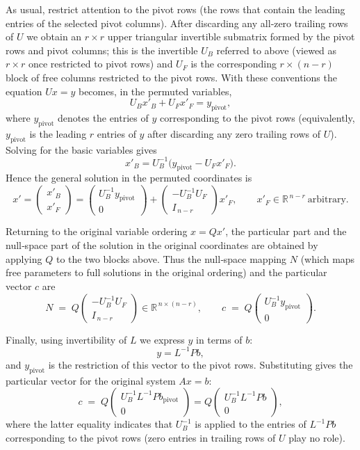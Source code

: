 \documentclass{article}
\begin{document}
As usual, restrict attention to the pivot rows (the rows that contain the leading entries of the selected pivot columns). After discarding any all‑zero trailing rows of \(U\) we obtain an \(r\times r\) upper triangular invertible submatrix formed by the pivot rows and pivot columns; this is the invertible \(U_B\) referred to above (viewed as \(r\times r\) once restricted to pivot rows) and \(U_F\) is the corresponding \(r\times(n-r)\) block of free columns restricted to the pivot rows. With these conventions the equation \(Ux=y\) becomes, in the permuted variables,
\[
U_B x'_B + U_F x'_F = y_{\mathrm{pivot}},
\]
where \(y_{\mathrm{pivot}}\) denotes the entries of \(y\) corresponding to the pivot rows (equivalently, \(y_{\mathrm{pivot}}\) is the leading \(r\) entries of \(y\) after discarding any zero trailing rows of \(U\)). Solving for the basic variables gives
\[
x'_B = U_B^{-1}\bigl(y_{\mathrm{pivot}} - U_F x'_F\bigr).
\]
Hence the general solution in the permuted coordinates is
\[
x'=\begin{pmatrix}x'_B\\[2pt] x'_F\end{pmatrix}
=\begin{pmatrix}U_B^{-1}y_{\mathrm{pivot}}\\[2pt] 0\end{pmatrix}
+\begin{pmatrix}-U_B^{-1}U_F\\[2pt] I_{\,n-r}\end{pmatrix}x'_F,
\qquad x'_F\in\mathbb{R}^{\,n-r}\ \text{arbitrary}.
\]

Returning to the original variable ordering \(x = Qx'\), the particular part and the null‑space part of the solution in the original coordinates are obtained by applying \(Q\) to the two blocks above. Thus the null‑space mapping \(N\) (which maps free parameters to full solutions in the original ordering) and the particular vector \(c\) are
\[
N \;=\; Q
\begin{pmatrix}-U_B^{-1}U_F\\[3pt] I_{\,n-r}\end{pmatrix}
\in\mathbb{R}^{\,n\times(n-r)},\qquad
c \;=\; Q\begin{pmatrix}U_B^{-1}y_{\mathrm{pivot}}\\[3pt]0\end{pmatrix}.
\]

Finally, using invertibility of \(L\) we express \(y\) in terms of \(b\):
\[
y=L^{-1}Pb,
\]
and \(y_{\mathrm{pivot}}\) is the restriction of this vector to the pivot rows. Substituting gives the particular vector for the original system \(Ax=b\):
\[
c \;=\; Q\begin{pmatrix}U_B^{-1}L^{-1}Pb_{\mathrm{pivot}}\\[3pt]0\end{pmatrix}
= Q\begin{pmatrix}U_B^{-1}L^{-1}Pb\\[3pt]0\end{pmatrix},
\]
where the latter equality indicates that \(U_B^{-1}\) is applied to the entries of \(L^{-1}Pb\) corresponding to the pivot rows (zero entries in trailing rows of \(U\) play no role).
\end{document}
